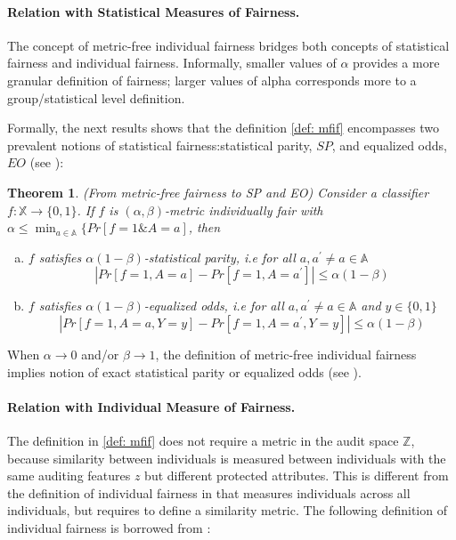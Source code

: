 \documentclass{article}
\newtheorem{thm}{Theorem}[section]
\begin{document}
\paragraph{Relation with Statistical Measures of Fairness.}
The concept of metric-free individual fairness bridges both concepts of statistical fairness and individual fairness. Informally, smaller values of $\alpha$ provides a more granular definition of fairness; larger values of alpha corresponds more to a group/statistical level definition. 

\bigskip
Formally, the next results shows that the definition \ref{def: mfif} encompasses two prevalent notions of statistical fairness:statistical parity, $SP$, and equalized odds, $EO$ (see \cite{hardt2016equality}):

\begin{thm}(From metric-free fairness to SP and EO)
\label{thm: SP}
Consider a classifier $f: \mathbb{X} \rightarrow \{0, 1\}$.  If $f$ is $(\alpha,\beta)$-metric individually fair with $\alpha \leq \min_{a\in \mathbb{A}}\{Pr[f=1 \& A=a]$, then 
\begin{enumerate}[(a)]
    \item $f$ satisfies $\alpha(1-\beta)$-statistical parity, i.e for all $a, a^{'}\neq a \in \mathbb{A}$
$$ |Pr[f=1, A=a] - Pr[f=1, A=a^{'}]| \leq \alpha(1-\beta)$$
    \item $f$ satisfies $\alpha(1-\beta)$-equalized odds, i.e for all $a, a^{'}\neq a \in \mathbb{A}$ and $y\in\{0,1\}$
$$ |Pr[f=1, A=a, Y=y] - Pr[f=1, A=a^{'}, Y=y]| \leq \alpha(1-\beta)$$
\end{enumerate}
\end{thm}

When $\alpha \rightarrow 0$ and/or $\beta\rightarrow 1$, the definition of metric-free individual fairness implies notion of  exact statistical parity or equalized odds (see \cite{hardt2016equality}).

\paragraph{Relation with Individual Measure of Fairness.}
The definition in \ref{def: mfif} does not require a metric in the audit space $\mathbb{Z}$, because similarity between individuals is measured between individuals with the same auditing features $z$ but different protected attributes. This is different from the definition of individual fairness in \cite{dwork2012fairness} that measures individuals across all individuals, but requires to define a similarity metric. The following definition of individual fairness is borrowed from \cite{dwork2012fairness}:
\end{document}
